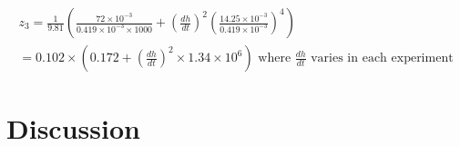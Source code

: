 \documentclass{article}
\begin{document}
\begin{multline*}
z_3 = \frac{1}{9.81} (\frac{72\times10^{-3}}{0.419\times10^{-3} \times 1000} + (\frac{dh}{dt})^2(\frac{14.25\times10^{-3}}{0.419\times10^{-3}})^4)\\= 0.102\times(0.172 + (\frac{dh}{dt})^2 \times1.34\times{10^6}) \textrm{ where $\frac{dh}{dt}$ varies in each experiment}
\end{multline*}

\section{Discussion}

\setlength{\parindent}{1cm} 
\end{document}
